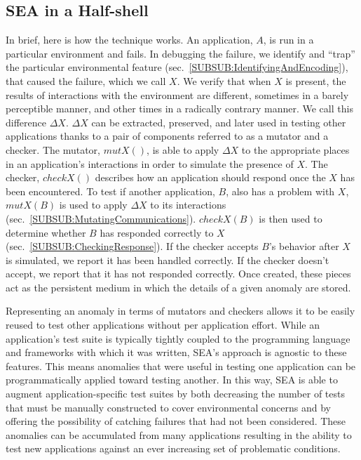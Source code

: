 \subsection{SEA in a Half-shell}
\label{SEC:SEAHalfshell}
In brief,
here is how the technique works.
An application, $A$, is run
in a particular environment and fails.
In debugging the failure,
we identify and ``trap'' the particular environmental feature
(sec.~\ref{SUBSUB:IdentifyingAndEncoding}),
that caused the failure,  which we call $X$.
We verify that when $X$ is present,
the results of interactions with the
environment are different,
sometimes in a barely perceptible manner,
and other times in a radically contrary manner.
We call this difference $\Delta X$.
$\Delta X$ can be extracted, preserved,
and later used in testing other applications
thanks to a pair of components referred to as a mutator and a checker.
The mutator, $mutX()$,
is able to apply $\Delta X$
to the appropriate places in an application's interactions
in order to simulate the presence of $X$.
The checker, $checkX()$ describes how an
application should respond once the $X$ has been encountered.
To test if another application, $B$, also has a problem with $X$,
$mutX(B)$ is used to apply $\Delta X$ to its interactions
(sec.~\ref{SUBSUB:MutatingCommunications}).
$checkX(B)$ is then used to determine whether
$B$ has responded correctly to $X$(sec.~\ref{SUBSUB:CheckingResponse}).
If the checker accepts $B$'s behavior
after $X$ is simulated,
we report it has been handled correctly.
If the checker doesn't accept, we report that it has not responded correctly.
Once created,
these pieces act as the persistent medium in which the details of
a given anomaly are stored.

Representing an anomaly in terms of mutators and checkers
allows it to be easily reused to test other applications
without per application effort.
While an application's test suite is typically
tightly coupled to the programming language
and frameworks with which it was written,
SEA's approach is agnostic to these features.
This means anomalies that were useful in testing one application
can be programmatically applied toward testing another.
In this way, SEA is able to augment application-specific test suites
by both decreasing the number of tests
that must be manually constructed
to cover environmental concerns
and by offering the possibility of catching
failures that had not been considered.
These anomalies can be accumulated from many applications
resulting in the ability to test new applications
against an ever increasing
set of problematic conditions.

